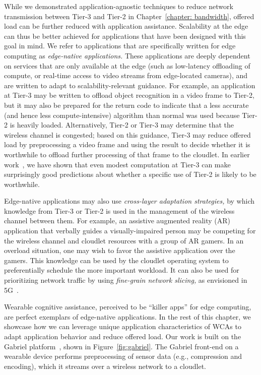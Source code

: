 While we demonstrated application-agnostic techniques to reduce network
transmission between Tier-3 and Tier-2 in Chapter~\ref{chapter: bandwidth},
offered load can be further reduced with application assistance. Scalability at
the edge can thus be better achieved for applications that have been designed
with this goal in mind.  We refer to applications that are specifically written
for edge computing as {\em edge-native applications.}  These applications are
deeply dependent on services that are only available at the edge (such as
low-latency offloading of compute, or real-time access to video streams from
edge-located cameras), and are written to adapt to scalability-relevant
guidance.  For example, an application at Tier-3 may be written to offload
object recognition in a video frame to Tier-2, but it may also be prepared for
the return code to indicate that a less accurate (and hence less
compute-intensive) algorithm than normal was used because Tier-2 is heavily
loaded.  Alternatively, Tier-2 or Tier-3 may determine that the wireless channel
is congested; based on this guidance, Tier-3 may reduce offered load by
preprocessing a video frame and using the result to decide whether it is
worthwhile to offload further processing of that frame to the cloudlet.  In
earlier work~\cite{Hu2015}, we have shown that even modest computation at Tier-3
can make surprisingly good predictions about whether a specific use of Tier-2 is
likely to be worthwhile.

Edge-native applications may also use {\em cross-layer adaptation
  strategies,} by which knowledge from Tier-3 or Tier-2 is used in the
management of the wireless channel between them.  For example, an
assistive augmented reality (AR) application that verbally guides a
visually-impaired person may be competing for the wireless channel and
cloudlet resources with a group of AR gamers.  In an overload
situation, one may wish to favor the assistive application over the
gamers.  This knowledge can be used by the cloudlet operating system
to preferentially schedule the more important workload.  It can also
be used for prioritizing network traffic by using {\em fine-grain
  network slicing,} as envisioned in 5G~\cite{Contreras2018}.

Wearable cognitive assistance, perceived to be ``killer apps'' for edge
computing, are perfect exemplars of edge-native applications. In the rest of
this chapter, we showcase how we can leverage unique application characteristics
of WCAs to adapt application behavior and reduce offered load. Our work is built
on the Gabriel platform~\cite{ha2014towards,chen2017empirical}, shown in
Figure~\ref{fig:gabriel}. The Gabriel front-end on a wearable device performs
preprocessing of sensor data (e.g., compression and encoding), which it streams
over a wireless network to a cloudlet.  

